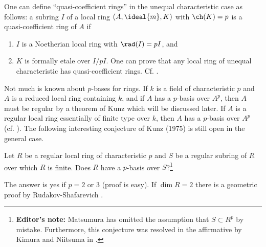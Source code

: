 \documentclass[../main]{subfiles}
\begin{document}
One can define ``quasi-coefficient rings'' in the unequal characteristic case as follows: a subring $I$ of a local ring $(A,\ideal{m},K)$ with $\ch(K) = p$ is a quasi-coefficient ring of $A$ if
\begin{enumerate}[label = (\arabic*)]
    \item $I$ is a Noetherian local ring with $\rad(I) = pI$, and
    \item $K$ is formally etale over $I/pI$. One can prove that any local ring of unequal characteristic has quasi-coefficient rings. Cf. \cite{matsumuranagoya1977}. 
\end{enumerate}

\newparagraph
Not much is known about $p$-bases for rings. If $k$ is a field of characteristic $p$ and $A$ is a reduced local ring containing $k$, and if $A$ has a $p$-basis over $A^p$, then $A$ must be regular by a theorem of Kunz which will be discussed later. If $A$ is a regular local ring essentially of finite type over $k$, then $A$ has a $p$-basis over $A^p$ (cf. \cite{kimurani1980regular}). The following interesting conjecture of Kunz (1975) is still open in the general case.
\begin{conjecture*}%
    Let $R$ be a regular local ring of characteristic $p$ and $S$ be a regular subring of $R$ over which $R$ is finite. Does $R$ have a $p$-basis over $S$?\footnote{\textbf{Editor's note:} Matsumura has omitted the assumption that $S\subset R^p$ by mistake. Furthermore, this conjecture was resolved in the affirmative by Kimura and Niitsuma in \cite{kimuraniitsuma1982}.}
\end{conjecture*}
The answer is yes if $p=2$ or 3 (proof is easy). If $\dim R = 2$ there is a geometric proof by Rudakov-Shafarevich \cite{rudakovshafarevich1976}.
\end{document}

